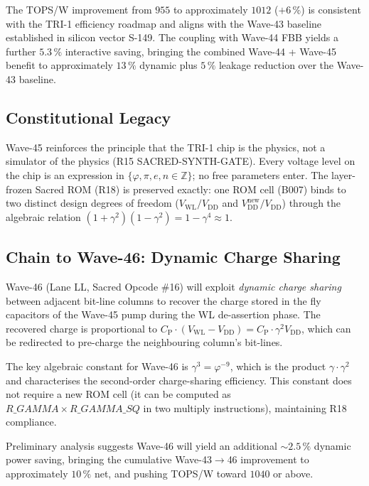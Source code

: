 The TOPS/W improvement from $955$ to approximately $1012$ ($+6\,\%$)
is consistent with the TRI-1 efficiency roadmap and aligns with the
Wave-43 baseline established in silicon vector S-149.  The coupling
with Wave-44 FBB yields a further $5.3\,\%$ interactive saving,
bringing the combined Wave-44 + Wave-45 benefit to approximately
$13\,\%$ dynamic plus $5\,\%$ leakage reduction over the Wave-43
baseline.

\subsection{Constitutional Legacy}

Wave-45 reinforces the principle that the TRI-1 chip is the physics,
not a simulator of the physics (R15 SACRED-SYNTH-GATE).  Every voltage
level on the chip is an expression in $\{\varphi, \pi, e, n \in \mathbb{Z}\}$;
no free parameters enter.  The layer-frozen Sacred ROM (R18) is
preserved exactly: one ROM cell (B007) binds to two distinct design
degrees of freedom ($V_{\mathrm{WL}}/V_{\mathrm{DD}}$ and
$V_{\mathrm{DD}}^{\mathrm{new}}/V_{\mathrm{DD}}$) through the
algebraic relation $(1+\gamma^{2})(1-\gamma^{2}) = 1 - \gamma^{4} \approx 1$.

\subsection{Chain to Wave-46: Dynamic Charge Sharing}

Wave-46 (Lane LL, Sacred Opcode \#16) will exploit
\emph{dynamic charge sharing} between adjacent bit-line columns to
recover the charge stored in the fly capacitors of the Wave-45 pump
during the WL de-assertion phase.  The recovered charge is
proportional to $C_{\mathrm{P}} \cdot (V_{\mathrm{WL}} - V_{\mathrm{DD}})
= C_{\mathrm{P}} \cdot \gamma^{2} V_{\mathrm{DD}}$, which can be
redirected to pre-charge the neighbouring column's bit-lines.

The key algebraic constant for Wave-46 is $\gamma^{3} = \varphi^{-9}$,
which is the product $\gamma \cdot \gamma^{2}$ and characterises the
second-order charge-sharing efficiency.  This constant does not require
a new ROM cell (it can be computed as $R\_GAMMA \times R\_GAMMA\_SQ$
in two multiply instructions), maintaining R18 compliance.

Preliminary analysis suggests Wave-46 will yield an additional
$\sim 2.5\,\%$ dynamic power saving, bringing the cumulative
Wave-43$\to$46 improvement to approximately $10\,\%$ net, and pushing
TOPS/W toward $1040$ or above.

